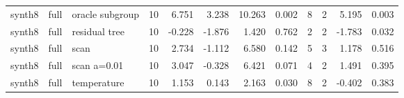 \begin{tabular}{lllrrrrrrrrr}
synth8 & full & oracle subgroup & 10 & 6.751 & 3.238 & 10.263 & 0.002 & 8 & 2 & 5.195 & 0.003 \\
synth8 & full & residual tree & 10 & -0.228 & -1.876 & 1.420 & 0.762 & 2 & 2 & -1.783 & 0.032 \\
synth8 & full & scan & 10 & 2.734 & -1.112 & 6.580 & 0.142 & 5 & 3 & 1.178 & 0.516 \\
synth8 & full & scan a=0.01 & 10 & 3.047 & -0.328 & 6.421 & 0.071 & 4 & 2 & 1.491 & 0.395 \\
synth8 & full & temperature & 10 & 1.153 & 0.143 & 2.163 & 0.030 & 8 & 2 & -0.402 & 0.383 \\
\bottomrule
\end{tabular}
